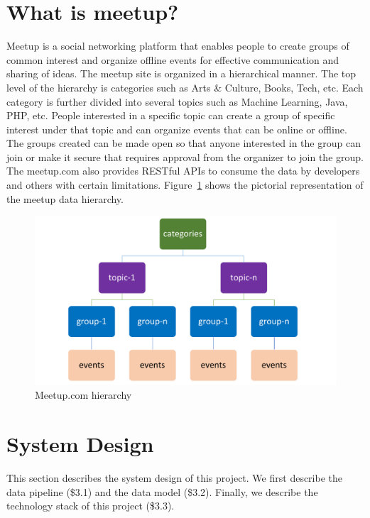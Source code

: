 \documentclass{acm_proc_article-sp}
\begin{document}
\section{What is meetup?}
Meetup\cite{www-meetup} is a social networking platform that enables people to create groups of common interest and organize offline events for effective communication and sharing of ideas.  The meetup site is organized in a hierarchical manner.  The top level of the hierarchy is categories such as Arts \& Culture, Books, Tech, etc.  Each category is further divided into several topics such as Machine Learning, Java, PHP, etc.  People interested in a specific topic can create a group of specific interest under that topic and can organize events that can be online or offline.  The groups created can be made open so that anyone interested in the group can join or make it secure that requires approval from the organizer to join the group.  The meetup.com also provides RESTful APIs \cite{www-meetup-api} to consume the data by developers and others with certain limitations.  Figure~\ref{F:hierarchy} shows the pictorial representation of the meetup data hierarchy.
\begin{figure}[!ht]
  \centering
      \includegraphics[width=1.0\columnwidth]{images/meetup_hierarchy.pdf}
  \caption{Meetup.com hierarchy}\label{F:hierarchy}
\end{figure}

\section{System Design}
This section describes the system design of this project.  We first describe the data pipeline (\$3.1) and the data model (\$3.2).  Finally, we describe the technology stack of this project (\$3.3). 
\end{document}
